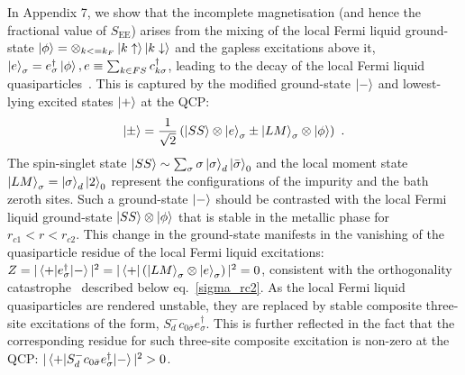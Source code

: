 In Appendix 7, we show that the incomplete magnetisation (and hence the fractional value of \(S_\text{EE}\)) arises from the mixing of the local Fermi liquid ground-state \(\ket{\phi} = \otimes_{k <= k_F} \ket{k \uparrow}\ket{k \downarrow}\) and the gapless excitations above it, \(\ket{e}_\sigma = e^\dagger_\sigma \ket{\phi}, e \equiv \sum_{k \in FS} c^\dagger_{k\sigma}\), leading to the decay of the local Fermi liquid quasiparticles~\cite{varma2002singular}. This is captured by the modified ground-state \(\ket{-}\) and lowest-lying excited states \(\ket{+}\) at the QCP:
\begin{eqnarray}\label{new-ground-state}
	\ket{\pm} = \frac{1}{\sqrt 2}\left(\ket{SS}\otimes\ket{e}_\sigma \pm \ket{LM}_\sigma\otimes\ket{\phi}\right)~.
\end{eqnarray}
The spin-singlet state \(\ket{SS} \sim \sum_\sigma \sigma\ket{\sigma}_d\ket{\bar\sigma}_0\) and the local moment state \(\ket{LM}_\sigma = \ket{\sigma}_d \ket{2}_0\) represent the configurations of the impurity and the bath zeroth sites. Such a ground-state \(\ket{-}\) should be contrasted with the local Fermi liquid ground-state \(\ket{SS}\otimes\ket{\phi}\) that is stable in the metallic phase for \(r_{c1} < r < r_{c2}\). This change in the ground-state manifests in the vanishing of the quasiparticle residue of the local Fermi liquid excitations: \(Z = |\braket{+ | e^\dagger_{\sigma} | -}|^2 = |\bra{+} \left(\ket{LM}_\sigma\otimes \ket{e}_\sigma\right)|^2 = 0\), consistent with the orthogonality catastrophe~\cite{anderson1967infrared} described below eq.~\eqref{sigma_rc2}.
As the local Fermi liquid quasiparticles are rendered unstable, they are replaced by stable composite three-site excitations of the form, \(S_d^- c_{0 \bar\sigma} e^\dagger_\sigma\). This is further reflected in the fact that the corresponding residue for such three-site composite excitation is non-zero at the QCP: \(|\braket{+|S_d^- c_{0 \bar\sigma} e^\dagger_\sigma|-}|^2 > 0\).

